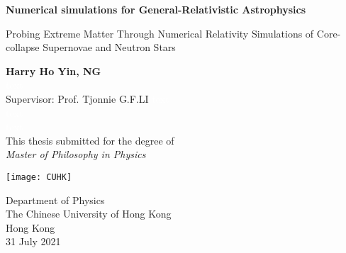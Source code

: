 \begin{titlepage}
    \begin{center}
        \vspace*{1cm}
        
        \Huge
        \textbf{Numerical simulations for General-Relativistic Astrophysics}
        
        \vspace{0.5cm}
        \LARGE
	Probing Extreme Matter Through Numerical Relativity Simulations
	of Core-collapse Supernovae and Neutron Stars
        
        \vspace{1.5cm}
        
        \textbf{Harry Ho Yin, NG}\\
        \textcolor{white}{text}\\
        Supervisor: Prof. Tjonnie G.F.LI
        \textcolor{white}{text}\\
        \textcolor{white}{text}\\
        \textcolor{white}{text}\\
        
        This thesis submitted for the degree of\\
        \Large{\textsl{Master of Philosophy in Physics}}
        
        \vspace{0.8cm}
        
        \texttt{[image: CUHK]}
        
        \Large
        Department of Physics\\
        The Chinese University of Hong Kong\\
        Hong Kong\\
        31 July 2021
        
    \end{center}
\end{titlepage}
